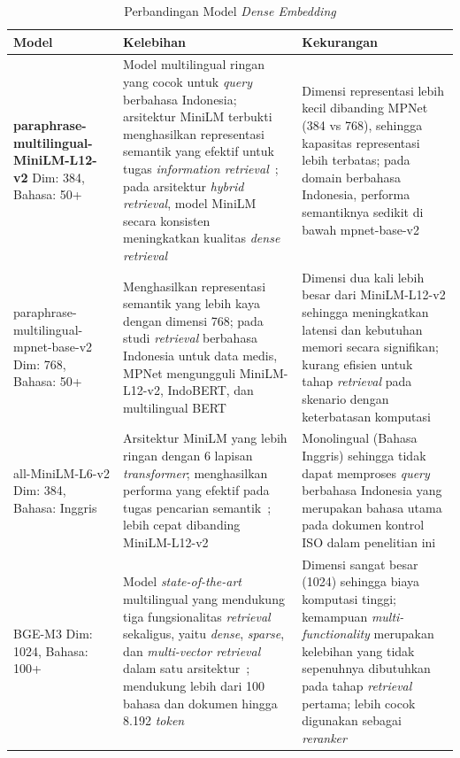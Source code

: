 \begin{table}[H]
\centering
\small
\caption{Perbandingan Model \textit{Dense Embedding}}
\label{tab:perbandingan_dense}
\begin{tabular}{|p{3.2cm}|p{5.6cm}|p{5.6cm}|}
\hline
\textbf{Model} & \textbf{Kelebihan} & \textbf{Kekurangan} \\
\hline
\textbf{paraphrase-multilingual-MiniLM-L12-v2} \newline Dim: 384, Bahasa: 50+ &
Model multilingual ringan yang cocok untuk \textit{query} berbahasa Indonesia; arsitektur MiniLM terbukti menghasilkan representasi semantik yang efektif untuk tugas \textit{information retrieval}~\cite{wang2022minilm}; pada arsitektur \textit{hybrid retrieval}, model MiniLM secara konsisten meningkatkan kualitas \textit{dense retrieval}~\cite{ravishankar2025hybrid} &
Dimensi representasi lebih kecil dibanding MPNet (384 vs 768), sehingga kapasitas representasi lebih terbatas; pada domain berbahasa Indonesia, performa semantiknya sedikit di bawah mpnet-base-v2~\cite{maryamah2024mpnet} \\
\hline
paraphrase-multilingual-mpnet-base-v2 \newline Dim: 768, Bahasa: 50+ &
Menghasilkan representasi semantik yang lebih kaya dengan dimensi 768; pada studi \textit{retrieval} berbahasa Indonesia untuk data medis, MPNet mengungguli MiniLM-L12-v2, IndoBERT, dan multilingual BERT~\cite{maryamah2024mpnet} &
Dimensi dua kali lebih besar dari MiniLM-L12-v2 sehingga meningkatkan latensi dan kebutuhan memori secara signifikan; kurang efisien untuk tahap \textit{retrieval} pada skenario dengan keterbatasan komputasi \\
\hline
all-MiniLM-L6-v2 \newline Dim: 384, Bahasa: Inggris &
Arsitektur MiniLM yang lebih ringan dengan 6 lapisan \textit{transformer}; menghasilkan performa yang efektif pada tugas pencarian semantik~\cite{reimers2019sbert}; lebih cepat dibanding MiniLM-L12-v2 &
Monolingual (Bahasa Inggris) sehingga tidak dapat memproses \textit{query} berbahasa Indonesia yang merupakan bahasa utama pada dokumen kontrol ISO dalam penelitian ini \\
\hline
BGE-M3 \newline Dim: 1024, Bahasa: 100+ &
Model \textit{state-of-the-art} multilingual yang mendukung tiga fungsionalitas \textit{retrieval} sekaligus, yaitu \textit{dense}, \textit{sparse}, dan \textit{multi-vector retrieval} dalam satu arsitektur~\cite{chen2024bge}; mendukung lebih dari 100 bahasa dan dokumen hingga 8.192 \textit{token} &
Dimensi sangat besar (1024) sehingga biaya komputasi tinggi; kemampuan \textit{multi-functionality} merupakan kelebihan yang tidak sepenuhnya dibutuhkan pada tahap \textit{retrieval} pertama; lebih cocok digunakan sebagai \textit{reranker}~\cite{elkiran2026empirical} \\

\hline

\end{tabular}
\end{table}

